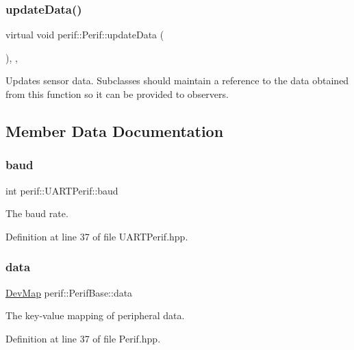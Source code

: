 \subsubsection{\texorpdfstring{updateData()}{updateData()}}
{\footnotesize\ttfamily virtual void perif\+::\+Perif\+::update\+Data (\begin{DoxyParamCaption}{ }\end{DoxyParamCaption})\hspace{0.3cm}{\ttfamily [protected]}, {}, {\ttfamily [inherited]}}

Updates sensor data. Subclasses should maintain a reference to the data obtained from this function so it can be provided to observers. 

\subsection{Member Data Documentation}
\mbox{\label{classperif_1_1UARTPerif_a8d5c1c0ce1f1758392dc0145f0caade8}} 
\subsubsection{\texorpdfstring{baud}{baud}}
{\footnotesize\ttfamily int perif\+::\+U\+A\+R\+T\+Perif\+::baud\hspace{0.3cm}{\ttfamily [protected]}}

The baud rate. 

Definition at line 37 of file U\+A\+R\+T\+Perif.\+hpp.

\mbox{\label{classperif_1_1PerifBase_a1a3afaa535fda17e9f97123fffe78765}} 
\subsubsection{\texorpdfstring{data}{data}}
{\footnotesize\ttfamily \mbox{\hyperlink{Perif_8hpp_a358ff4ee6d24694ee7661f0cce14377e}{Dev\+Map}} perif\+::\+Perif\+Base\+::data\hspace{0.3cm}{\ttfamily [inherited]}}

The key-\/value mapping of peripheral data. 

Definition at line 37 of file Perif.\+hpp.


